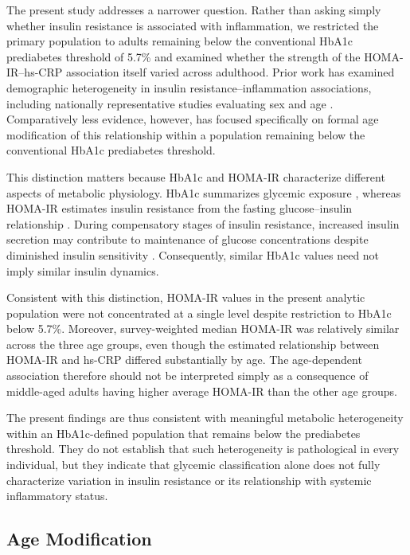 \documentclass[11pt]{article}
\begin{document}
The present study addresses a narrower question. Rather than asking simply
whether insulin resistance is associated with inflammation, we restricted
the primary population to adults remaining below the conventional HbA1c
prediabetes threshold of 5.7\% \citep{ADA2026Diagnosis} and examined whether
the strength of the HOMA-IR--hs-CRP association itself varied across
adulthood. Prior work has examined demographic heterogeneity in
insulin resistance--inflammation associations, including nationally
representative studies evaluating sex and age
\citep{Caporaso2020,Shahid2023}. Comparatively less evidence, however, has
focused specifically on formal age modification of this relationship within
a population remaining below the conventional HbA1c prediabetes threshold.

This distinction matters because HbA1c and HOMA-IR characterize different
aspects of metabolic physiology. HbA1c summarizes glycemic exposure
\citep{Nathan2007,ADA2026Diagnosis}, whereas HOMA-IR estimates insulin
resistance from the fasting glucose--insulin relationship
\citep{Matthews1985,Wallace2004}. During compensatory stages of insulin
resistance, increased insulin secretion may contribute to maintenance of
glucose concentrations despite diminished insulin sensitivity
\citep{Rodzen2026}. Consequently, similar HbA1c values need not imply
similar insulin dynamics.

Consistent with this distinction, HOMA-IR values in the present analytic
population were not concentrated at a single level despite restriction to
HbA1c below 5.7\%. Moreover, survey-weighted median HOMA-IR was relatively
similar across the three age groups, even though the estimated relationship
between HOMA-IR and hs-CRP differed substantially by age. The age-dependent
association therefore should not be interpreted simply as a consequence of
middle-aged adults having higher average HOMA-IR than the other age groups.

The present findings are thus consistent with meaningful metabolic
heterogeneity within an HbA1c-defined population that remains below the
prediabetes threshold. They do not establish that such heterogeneity is
pathological in every individual, but they indicate that glycemic
classification alone does not fully characterize variation in insulin
resistance or its relationship with systemic inflammatory status.

\subsection{Age Modification}
\end{document}
